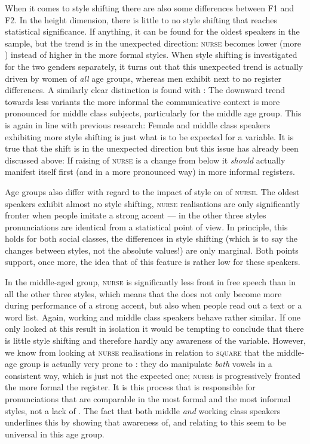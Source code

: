 When it comes to style shifting there are also some differences between F1 and F2.
In the height dimension, there is little to no style shifting that reaches statistical significance.
If anything, it can be found for the oldest speakers in the sample, but the trend is in the unexpected direction: \textsc{nurse} becomes lower (more ) instead of higher in the more formal styles.
When style shifting is investigated for the two genders separately, it turns out that this unexpected trend is actually driven by women of \emph{all} age groups, whereas men exhibit next to no register differences.
A similarly clear distinction is found with : The downward trend towards less  variants the more informal the communicative context is more pronounced for middle class subjects, particularly for the middle age group.
This is again in line with previous research: Female and middle class speakers exhibiting more style shifting is just what is to be expected for a  variable.
It is true that the shift is in the unexpected direction but this issue has already been discussed above: If raising of \textsc{nurse} is a change from below it \emph{should} actually manifest itself first (and in a more pronounced way) in more informal registers.

Age groups also differ with regard to the impact of style on  of \textsc{nurse}.
The oldest speakers exhibit almost no style shifting, \textsc{nurse} realisations are only significantly fronter when people imitate a strong  accent --- in the other three styles pronunciations are identical from a statistical point of view.
In principle, this holds for both social classes, the differences in style shifting (which is to say the changes between styles, not the absolute values!) are only marginal.
Both points support, once more, the idea that  of this feature is rather low for these speakers.

In the middle-aged group, \textsc{nurse} is significantly less front in free speech than in all the other three styles, which means that the  does not only become more  during performance of a strong accent, but also when people read out a text or a word list.
Again, working and middle class speakers behave rather similar.
If one only looked at this result in isolation it would be tempting to conclude that there is little style shifting and therefore hardly any awareness of the variable.
However, we know from looking at \textsc{nurse} realisations in relation to \textsc{square} that the middle-age group is actually very prone to : they do manipulate \emph{both} vowels in a consistent way, which is just not the expected one; \textsc{nurse} is progressively fronted the more formal the register.
It is this process that is responsible for pronunciations that are comparable in the most formal and the most informal styles, not a lack of .
The fact that both middle \emph{and} working class speakers  underlines this by showing that awareness of, and  relating to this  seem to be universal in this age group.

